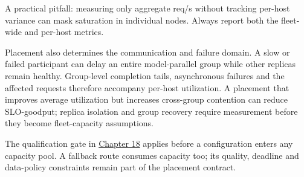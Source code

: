 A practical pitfall: measuring only aggregate req/s without tracking
per-host variance can mask saturation in individual nodes. Always report
both the fleet-wide and per-host metrics.

Placement also determines the communication and failure domain. A slow
or failed participant can delay an entire model-parallel group while
other replicas remain healthy. Group-level completion tails,
asynchronous failures and the affected requests therefore accompany
per-host utilization. A placement that improves average utilization but
increases cross-group contention can reduce SLO-goodput; replica
isolation and group recovery require measurement before they become
fleet-capacity assumptions.

The qualification gate in \hyperref[chap:18]{Chapter 18} applies before a configuration
enters any capacity pool. A fallback route consumes capacity too; its
quality, deadline and data-policy constraints remain part of the
placement contract.

\label{common-mistakes}


